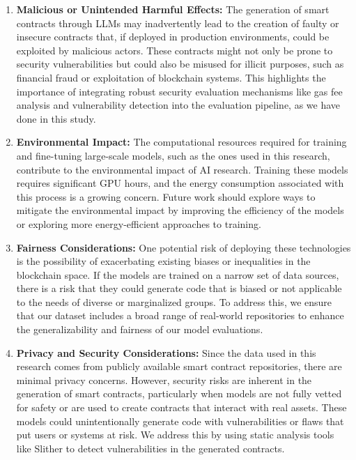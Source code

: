 \begin{enumerate}[leftmargin=*]
    \item \textbf{Malicious or Unintended Harmful Effects:} 
    The generation of smart contracts through LLMs may inadvertently lead to the creation of faulty or insecure contracts that, if deployed in production environments, could be exploited by malicious actors. These contracts might not only be prone to security vulnerabilities but could also be misused for illicit purposes, such as financial fraud or exploitation of blockchain systems. This highlights the importance of integrating robust security evaluation mechanisms like gas fee analysis and vulnerability detection into the evaluation pipeline, as we have done in this study.
    
    \item \textbf{Environmental Impact:} 
    The computational resources required for training and fine-tuning large-scale models, such as the ones used in this research, contribute to the environmental impact of AI research. Training these models requires significant GPU hours, and the energy consumption associated with this process is a growing concern. Future work should explore ways to mitigate the environmental impact by improving the efficiency of the models or exploring more energy-efficient approaches to training.
    
    \item \textbf{Fairness Considerations:} 
    One potential risk of deploying these technologies is the possibility of exacerbating existing biases or inequalities in the blockchain space. If the models are trained on a narrow set of data sources, there is a risk that they could generate code that is biased or not applicable to the needs of diverse or marginalized groups. To address this, we ensure that our dataset includes a broad range of real-world repositories to enhance the generalizability and fairness of our model evaluations.
    
    \item \textbf{Privacy and Security Considerations:} 
    Since the data used in this research comes from publicly available smart contract repositories, there are minimal privacy concerns. However, security risks are inherent in the generation of smart contracts, particularly when models are not fully vetted for safety or are used to create contracts that interact with real assets. These models could unintentionally generate code with vulnerabilities or flaws that put users or systems at risk. We address this by using static analysis tools like Slither to detect vulnerabilities in the generated contracts.
    

\end{enumerate}
